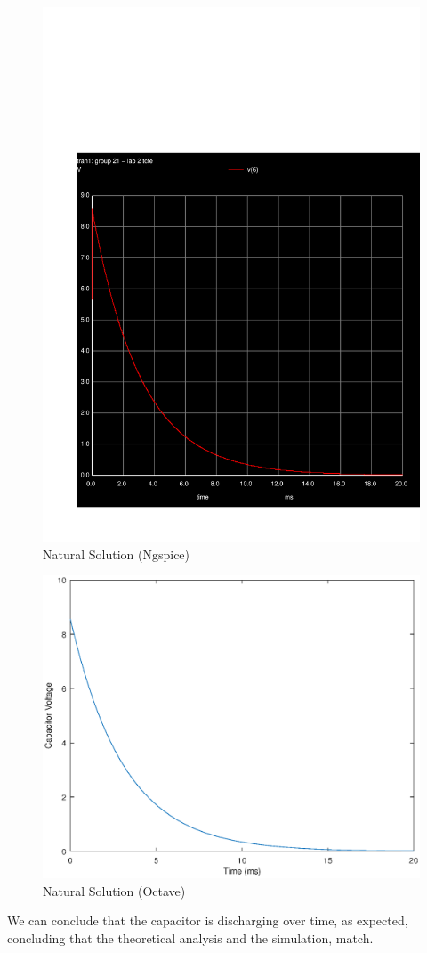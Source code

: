 \begin{figure}[h] \centering
\includegraphics[width=0.7\linewidth]{question_3.pdf}
\caption{Natural Solution (Ngspice)}
\label{fig:snat}
\end{figure}

\begin{figure}[h] \centering
\includegraphics[width=0.7\linewidth]{naturalsolution.eps}
\caption{Natural Solution (Octave)}
\label{fig:snat}
\end{figure}


We can conclude that the capacitor is discharging over time, as expected, concluding that the theoretical analysis and the simulation, match.


